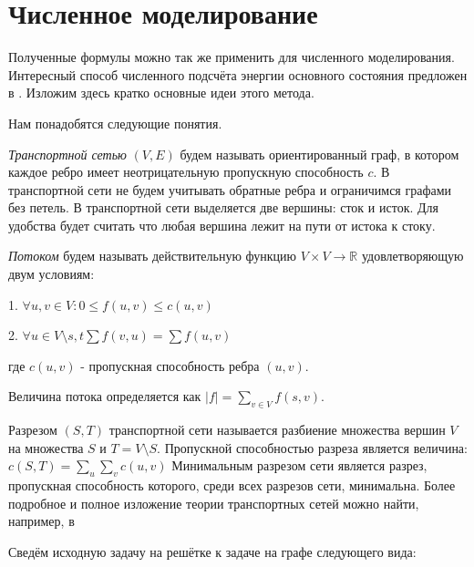 \section{Численное моделирование}
Полученные формулы можно так же применить для численного моделирования.
Интересный способ численного подсчёта энергии основного состояния предложен в \cite{hartmann2004new}. Изложим здесь кратко основные идеи этого метода.

Нам понадобятся следующие понятия.

\textit{Транспортной сетью} $(V,E)$ будем называть ориентированный граф, в котором каждое ребро имеет неотрицательную пропускную способность $c$. В транспортной сети не будем учитывать обратные ребра  и ограничимся графами без петель. В транспортной сети выделяется две вершины: сток и исток. Для удобства будет считать что любая вершина лежит на пути от истока к стоку.

\textit{Потоком} будем называть действительную функцию $V \times V \to \mathbb{R}$ удовлетворяющую двум условиям:

1. $\forall u, v \in V: 0\leq f(u,v) \leq c(u,v)$

2. $\forall u \in V\setminus {s,t} \sum f(v,u) = \sum f(u,v)$

где $c(u,v)$ - пропускная способность ребра $(u,v)$.

Величина потока определяется как  $|f| = \sum_{v\in V} f(s,v)$.

Разрезом $(S,T)$ транспортной сети называется разбиение множества вершин $V$ на множества $S$ и $T=V\setminus S$.
Пропускной способностью разреза является величина:
$c(S,T) = \sum_u \sum_v c(u,v)$
Минимальным разрезом сети является разрез, пропускная способность которого, среди всех разрезов сети, минимальна.
Более подробное и полное изложение теории транспортных сетей можно найти, например, в \cite{cormen2009introduction}

Сведём исходную задачу на решётке к задаче на графе следующего вида:

